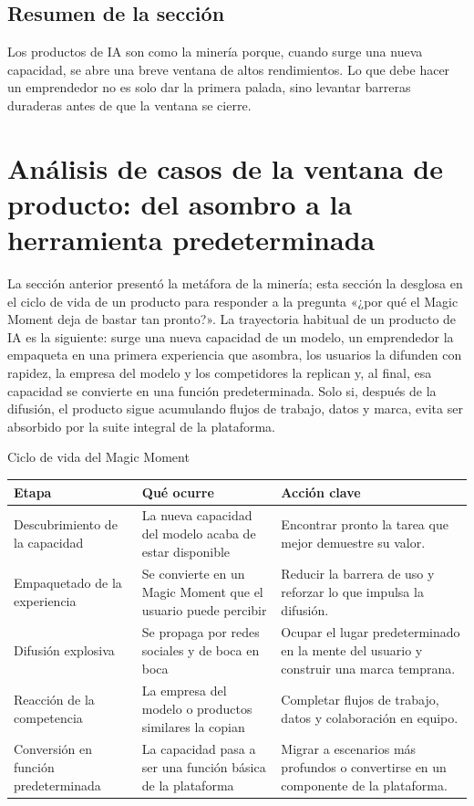 \documentclass[a4paper]{article}
\begin{document}
\subsection{Resumen de la sección}

Los productos de IA son como la minería porque, cuando surge una nueva capacidad, se abre una breve ventana de altos rendimientos. Lo que debe hacer un emprendedor no es solo dar la primera palada, sino levantar barreras duraderas antes de que la ventana se cierre.
\section{Análisis de casos de la ventana de producto: del asombro a la herramienta predeterminada}

La sección anterior presentó la metáfora de la minería; esta sección la desglosa en el ciclo de vida de un producto para responder a la pregunta «¿por qué el Magic Moment deja de bastar tan pronto?». La trayectoria habitual de un producto de IA es la siguiente: surge una nueva capacidad de un modelo, un emprendedor la empaqueta en una primera experiencia que asombra, los usuarios la difunden con rapidez, la empresa del modelo y los competidores la replican y, al final, esa capacidad se convierte en una función predeterminada. Solo si, después de la difusión, el producto sigue acumulando flujos de trabajo, datos y marca, evita ser absorbido por la suite integral de la plataforma.

\begin{knowledgebox}{Ciclo de vida del Magic Moment}
\begin{tabularx}{\textwidth}{p{}p{}X}
\toprule
Etapa & Qué ocurre & Acción clave \\
\midrule
Descubrimiento de la capacidad & La nueva capacidad del modelo acaba de estar disponible & Encontrar pronto la tarea que mejor demuestre su valor. \\
Empaquetado de la experiencia & Se convierte en un Magic Moment que el usuario puede percibir & Reducir la barrera de uso y reforzar lo que impulsa la difusión. \\
Difusión explosiva & Se propaga por redes sociales y de boca en boca & Ocupar el lugar predeterminado en la mente del usuario y construir una marca temprana. \\
Reacción de la competencia & La empresa del modelo o productos similares la copian & Completar flujos de trabajo, datos y colaboración en equipo. \\
Conversión en función predeterminada & La capacidad pasa a ser una función básica de la plataforma & Migrar a escenarios más profundos o convertirse en un componente de la plataforma. \\
\bottomrule
\end{tabularx}
\end{knowledgebox}
\end{document}
